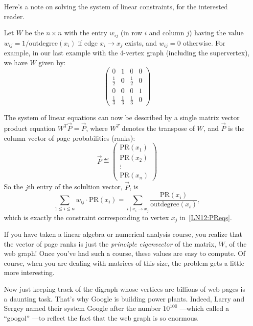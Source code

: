 \begin{editingnotes}
Here's a note on solving the system of linear constraints, for the
interested reader.

Let $W$ be the $n \times n$ with the entry $w_{ij}$ (in row $i$ and
column $j$) having the value $w_{ij} = 1/\text{outdegree}(x_i)$ if edge
$x_i \rightarrow x_j$ exists, and $w_{ij} = 0$ otherwise.  For example, in
our last example with the 4-vertex graph (including the supervertex), we have
$W$ given by:
\[
\left( \begin{array}{cccc}
    0 & 1 & 0 & 0 \\
    \frac{1}{2} & 0 & \frac{1}{2} & 0 \\
    0 & 0 & 0 & 1\\
    \frac{1}{3} & \frac{1}{3} & \frac{1}{3} & 0 \end{array} \right)
\]

The system of linear equations can now be described by a single matrix
vector product equation $W^T \vec{P} = \vec{P}$, where $W^T$ denotes the
transpose of $W$, and $\vec{P}$ is the column vector of page probabilities
(ranks):
\[\vec{P}\eqdef
\left( \begin{array}{c}
    \text{PR}(x_1) \\
    \text{PR}(x_2) \\
    \vdots \\
    \text{PR}(x_n) \end{array} \right)
\]
So the $j$th entry of the solultion vector, $\vec{P}$, is
\[
\sum_{1\leq i \leq n} w_{ij} \cdot \text{PR}(x_i) =
\sum_{i \mid x_i \rightarrow x_j} \frac{\text{PR}(x_i)}{\text{outdegree}(x_i)},
\]
which is exactly the constraint corresponding to vertex $x_j$
in~\eqref{LN12:PReqs}.

If you have taken a linear algebra or numerical analysis course, you
realize that the vector of page ranks is just the \emph{principle
  eigenvector} of the matrix, $W$, of the web graph!  Once you've had such
a course, these values are easy to compute.  Of course, when you are
dealing with matrices of this size, the problem gets a little more
interesting.

\end{editingnotes}

Now just keeping track of the digraph whose vertices are billions of web
pages is a daunting task.  That's why Google is building power plants.
Indeed, Larry and Sergey named their system Google after the number
$10^{100}$ ---which called a ``googol'' ---to reflect the fact that the
web graph is so enormous.

